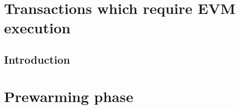 \section{Transactions which require EVM execution}
\subsection{Introduction}                                \label{hub: tx w/ evm execution introduction}       
\section{Prewarming phase \lispTodo{}}                   \label{hub: prewarming}                             
